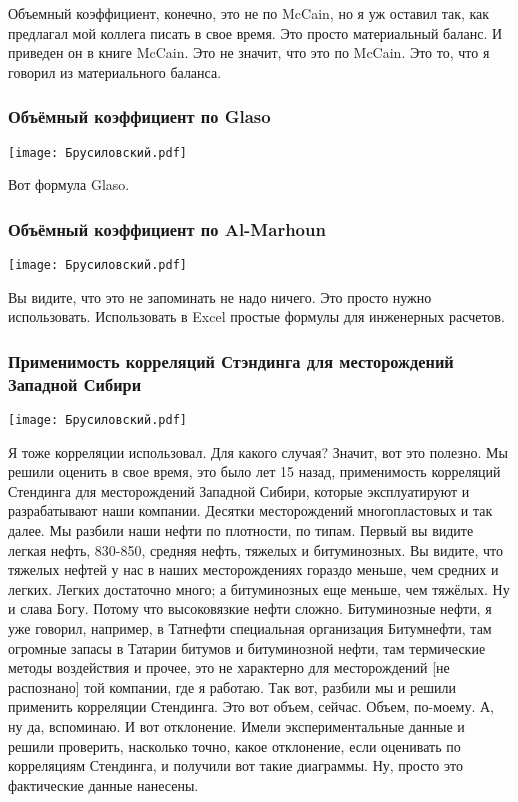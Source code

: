 \documentclass[main.tex]{subfiles}
\begin{document}
Объемный коэффициент, конечно, это не по McCain, но я уж оставил так, как предлагал мой коллега писать в свое время.
Это просто материальный баланс.
И приведен он в книге McCain.
Это не значит, что это по McCain.
Это то, что я говорил из материального баланса.

\subsubsection{Объёмный коэффициент по Glaso}

\begin{center}
\texttt{[image: Брусиловский.pdf]}
\end{center}

Вот формула Glaso.

\subsubsection{Объёмный коэффициент по Al-Marhoun}

\begin{center}
\texttt{[image: Брусиловский.pdf]}
\end{center}

Вы видите, что это не запоминать не надо ничего.
Это просто нужно использовать.
Использовать в Excel простые формулы для инженерных расчетов.

\subsubsection{Применимость корреляций Стэндинга для месторождений Западной Сибири}

\begin{center}
\texttt{[image: Брусиловский.pdf]}
\end{center}

Я тоже корреляции использовал.
Для какого случая?
Значит, вот это полезно.
Мы решили оценить в свое время, это было лет 15 назад, применимость корреляций Стендинга для месторождений Западной Сибири, которые эксплуатируют и разрабатывают наши компании.
Десятки месторождений многопластовых и так далее.
Мы разбили наши нефти по плотности, по типам.
Первый вы видите легкая нефть, 830-850, средняя нефть, тяжелых и битуминозных.
Вы видите, что тяжелых нефтей у нас в наших месторождениях гораздо меньше, чем средних и легких.
Легких достаточно много; а битуминозных еще меньше, чем тяжёлых.
Ну и слава Богу.
Потому что высоковязкие нефти сложно.
Битуминозные нефти, я уже говорил, например, в Татнефти специальная организация Битумнефти, там огромные запасы в Татарии битумов и битуминозной нефти, там термические методы воздействия и прочее, это не характерно для месторождений [не распознано] той компании, где я работаю.
Так вот, разбили мы и решили применить корреляции Стендинга.
Это вот объем, сейчас.
Объем, по-моему.
А, ну да, вспоминаю.
И вот отклонение.
Имели экспериментальные данные и решили проверить, насколько точно, какое отклонение, если оценивать по корреляциям Стендинга, и получили вот такие диаграммы.
Ну, просто это фактические данные нанесены.
\end{document}
